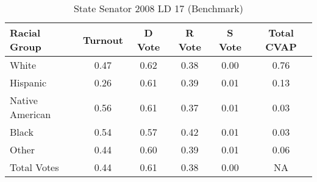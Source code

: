 \begin{table}[htb]
\begin{center}
\caption{State Senator 2008 LD 17 (Benchmark)}
\label{stsen08_cvap_ld_17_benchmark}
\begin{tabular}{lccccc}
  \hline
Racial Group & Turnout & D Vote & R Vote & S Vote & Total CVAP \\ 
  \hline
   White & 0.47  & 0.62  & 0.38  & 0.00  & 0.76 \\
    Hispanic & 0.26  & 0.61  & 0.39  & 0.01  & 0.13 \\
    Native American & 0.56  & 0.61  & 0.37  & 0.01  & 0.03 \\
    Black & 0.54  & 0.57  & 0.42  & 0.01  & 0.03 \\
    Other & 0.44  & 0.60  & 0.39  & 0.01  & 0.06 \\
    Total Votes & 0.44  & 0.61  & 0.38  & 0.00  &  NA \\

   \hline
\end{tabular}
\end{center}
\end{table}